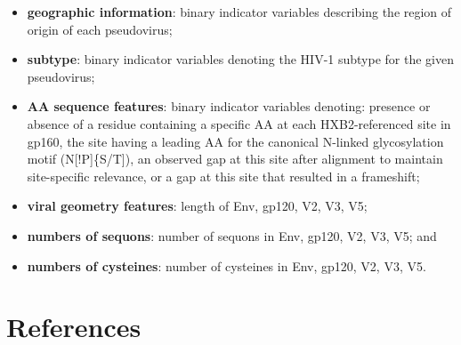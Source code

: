 \documentclass[
]{article}
\providecommand{\tightlist}{%
  \setlength{\itemsep}{0pt}\setlength{\parskip}{0pt}}
\begin{document}
\begin{itemize}
\tightlist
\item
  \textbf{geographic information}: binary indicator variables describing the region of origin of each pseudovirus;
\item
  \textbf{subtype}: binary indicator variables denoting the HIV-1 subtype for the given pseudovirus;
\item
  \textbf{AA sequence features}: binary indicator variables denoting: presence or absence of a residue containing a specific AA at each HXB2-referenced site in gp160, the site having a leading AA for the canonical N-linked glycosylation motif (N{[}!P{]}\{S/T{]}), an observed gap at this site after alignment to maintain site-specific relevance, or a gap at this site that resulted in a frameshift;
\item
  \textbf{viral geometry features}: length of Env, gp120, V2, V3, V5;
\item
  \textbf{numbers of sequons}: number of sequons in Env, gp120, V2, V3, V5; and
\item
  \textbf{numbers of cysteines}: number of cysteines in Env, gp120, V2, V3, V5.
\end{itemize}

\hypertarget{sec:refs}{%
\section{References}\label{sec:refs}}

  
\end{document}

